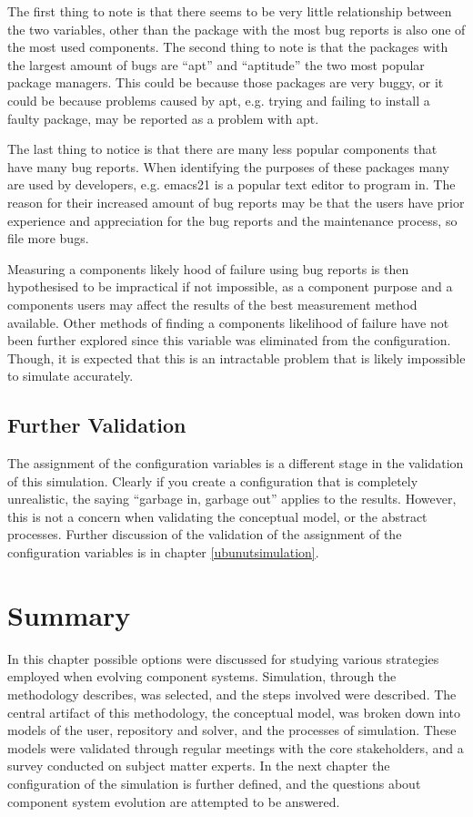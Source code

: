 The first thing to note is that there seems to be very little relationship between the two variables, other than the package with the most bug reports is also one of the most used components.
The second thing to note is that the packages with the largest amount of bugs are ``apt'' and ``aptitude'' the two most popular package managers.
This could be because those packages are very buggy, or it could be because problems caused by apt, e.g. trying and failing to install a faulty package, may be reported as a problem with apt.

The last thing to notice is that there are many less popular components that have many bug reports.
When identifying the purposes of these packages many are used by developers, e.g. emacs21 is a popular text editor to program in.
The reason for their increased amount of bug reports may be that the users have prior experience and appreciation for the bug reports and the maintenance process, so file more bugs.

Measuring a components likely hood of failure using bug reports is then hypothesised to be impractical if not impossible,
as a component purpose and a components users may affect the results of the best measurement method available.
Other methods of finding a components likelihood of failure have not been further explored since this variable was eliminated from the configuration.
Though, it is expected that this is an intractable problem that is likely impossible to simulate accurately.

\subsection{Further Validation}
The assignment of the configuration variables is a different stage in the validation of this simulation.
Clearly if you create a configuration that is completely unrealistic, the saying ``garbage in, garbage out'' applies to the results.
However, this is not a concern when validating the conceptual model, or the abstract processes.
Further discussion of the validation of the assignment of the configuration variables is in chapter \ref{ubunutsimulation}.

\section{Summary}
{}In this chapter possible options were discussed for studying various strategies employed when evolving component systems.
{}Simulation, through the methodology \citep{Law2005} describes, was selected, and the steps involved were described.
{}The central artifact of this methodology, the conceptual model, was broken down into models of the user, repository and solver, and the processes of simulation.
{}These models were validated through regular meetings with the core stakeholders, and a survey conducted on subject matter experts.
{}In the next chapter the configuration of the simulation is further defined, and the questions about component system evolution are attempted to be answered.
